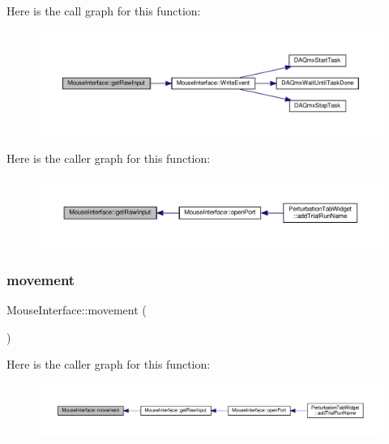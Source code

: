 Here is the call graph for this function\+:
\nopagebreak
\begin{figure}[H]
\begin{center}
\leavevmode
\includegraphics[width=350pt]{class_mouse_interface_ac1ad8eb6785b8a18c368faa8610494a7_cgraph}
\end{center}
\end{figure}
Here is the caller graph for this function\+:
\nopagebreak
\begin{figure}[H]
\begin{center}
\leavevmode
\includegraphics[width=350pt]{class_mouse_interface_ac1ad8eb6785b8a18c368faa8610494a7_icgraph}
\end{center}
\end{figure}
\mbox{\label{class_mouse_interface_a05ade9c71b34d400bd7e82a7119edf38}} 
\subsubsection{\texorpdfstring{movement}{movement}}
{\footnotesize\ttfamily Mouse\+Interface\+::movement (\begin{DoxyParamCaption}{ }\end{DoxyParamCaption})\hspace{0.3cm}{\ttfamily [signal]}}

Here is the caller graph for this function\+:
\nopagebreak
\begin{figure}[H]
\begin{center}
\leavevmode
\includegraphics[width=350pt]{class_mouse_interface_a05ade9c71b34d400bd7e82a7119edf38_icgraph}
\end{center}
\end{figure}
\mbox{\label{class_mouse_interface_a685376f397497ea5c91998e7cec4463e}} 
